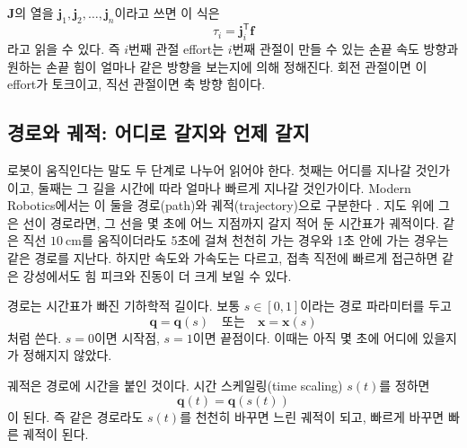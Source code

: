 \(\bm{J}\)의 열을 \(\bm{j}_1,\bm{j}_2,\ldots,\bm{j}_n\)이라고 쓰면 이 식은
\[
  \tau_i
  =
  \bm{j}_i^{\mathsf{T}}\bm{f}
\]
라고 읽을 수 있다.
즉 \(i\)번째 관절 effort는 \(i\)번째 관절이 만들 수 있는 손끝 속도 방향과 원하는 손끝 힘이 얼마나 같은 방향을 보는지에 의해 정해진다.
%
회전 관절이면 이 effort가 토크이고, 직선 관절이면 축 방향 힘이다.

\subsection{경로와 궤적: 어디로 갈지와 언제 갈지}
\label{sec:robotics-path-trajectory}

로봇이 움직인다는 말도 두 단계로 나누어 읽어야 한다.
첫째는 어디를 지나갈 것인가이고, 둘째는 그 길을 시간에 따라 얼마나 빠르게 지나갈 것인가이다.
Modern Robotics에서는 이 둘을 경로(path)와 궤적(trajectory)으로 구분한다 \cite{lynchpark2017modernrobotics}.
지도 위에 그은 선이 경로라면, 그 선을 몇 초에 어느 지점까지 갈지 적어 둔 시간표가 궤적이다.
같은 직선 \(10~\mathrm{cm}\)를 움직이더라도 5초에 걸쳐 천천히 가는 경우와 1초 안에 가는 경우는 같은 경로를 지난다.
하지만 속도와 가속도는 다르고, 접촉 직전에 빠르게 접근하면 같은 강성에서도 힘 피크와 진동이 더 크게 보일 수 있다.

경로는 시간표가 빠진 기하학적 길이다.
보통 \(s\in[0,1]\)이라는 경로 파라미터를 두고
\begin{equation}
  \bm{q}=\bm{q}(s)
  \quad \text{또는} \quad
  \bm{x}=\bm{x}(s)
\end{equation}
처럼 쓴다.
\(s=0\)이면 시작점, \(s=1\)이면 끝점이다.
이때는 아직 몇 초에 어디에 있을지가 정해지지 않았다.

궤적은 경로에 시간을 붙인 것이다.
시간 스케일링(time scaling) \(s(t)\)를 정하면
\begin{equation}
  \bm{q}(t)=\bm{q}(s(t))
  \label{eq:trajectory-time-scaling-foundation}
\end{equation}
이 된다.
즉 같은 경로라도 \(s(t)\)를 천천히 바꾸면 느린 궤적이 되고, 빠르게 바꾸면 빠른 궤적이 된다.

